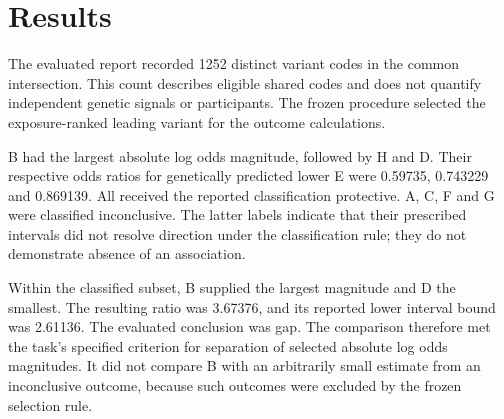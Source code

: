 \documentclass[10pt,a4paper]{article}
\begin{document}
\section*{Results}
The evaluated report recorded 1252 distinct variant codes in the common intersection. This count describes eligible shared codes and does not quantify independent genetic signals or participants. The frozen procedure selected the exposure-ranked leading variant for the outcome calculations.
\par
B had the largest absolute log odds magnitude, followed by H and D. Their respective odds ratios for genetically predicted lower E were 0.59735, 0.743229 and 0.869139. All received the reported classification protective. A, C, F and G were classified inconclusive. The latter labels indicate that their prescribed intervals did not resolve direction under the classification rule; they do not demonstrate absence of an association.
\par
Within the classified subset, B supplied the largest magnitude and D the smallest. The resulting ratio was 3.67376, and its reported lower interval bound was 2.61136. The evaluated conclusion was gap. The comparison therefore met the task's specified criterion for separation of selected absolute log odds magnitudes. It did not compare B with an arbitrarily small estimate from an inconclusive outcome, because such outcomes were excluded by the frozen selection rule.
\par
\end{document}
